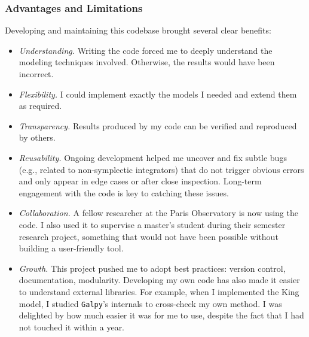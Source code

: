 \documentclass{article}
\begin{document}
        \subsubsection{Advantages and Limitations}

        Developing and maintaining this codebase brought several clear benefits:
        \begin{itemize}
            \item \textit{Understanding.} Writing the code forced me to deeply understand the modeling techniques involved. Otherwise, the results would have been incorrect.
            \item \textit{Flexibility.} I could implement exactly the models I needed and extend them as required.
            \item \textit{Transparency.} Results produced by my code can be verified and reproduced by others.
            \item \textit{Reusability.} Ongoing development helped me uncover and fix subtle bugs (e.g., related to non-symplectic integrators) that do not trigger obvious errors and only appear in edge cases or after close inspection. Long-term engagement with the code is key to catching these issues.
            \item \textit{Collaboration.} A fellow researcher at the Paris Observatory is now using the code. I also used it to supervise a master's student during their semester research project, something that would not have been possible without building a user-friendly tool.
            \item \textit{Growth.} This project pushed me to adopt best practices: version control, documentation, modularity. Developing my own code has also made it easier to understand external libraries. For example, when I implemented the King model, I studied \texttt{Galpy}'s internals to cross-check my own method. I was delighted by how much easier it was for me to use, despite the fact that I had not touched it within a year.
        \end{itemize}
\end{document}
